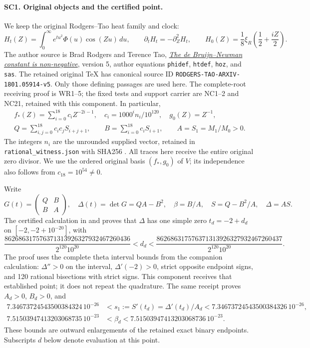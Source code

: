 \paragraph{SC1. Original objects and the certified point.}
We keep the original Rodgers--Tao heat family and clock:
\[
 H_t(Z)=\int_0^\infty e^{tu^2}\Phi(u)\cos(Zu)\,du,\qquad
 \partial_tH_t=-\partial_Z^2H_t,\qquad
 H_0(Z)=\frac18\xi_R\!\left(\frac12+\frac{iZ}{2}\right).
 \tag{SC1}
\]
The author source is Brad Rodgers and Terence Tao,
\href{https://arxiv.org/abs/1801.05914v5}{\emph{The de Bruijn--Newman
constant is non-negative}}, version 5, author equations
\texttt{phidef}, \texttt{htdef}, \texttt{hoz}, and \texttt{sas}.
The retained original TeX has canonical source ID
\texttt{RODGERS-TAO-ARXIV-1801.05914-v5}.
Only those defining passages are used here. The complete-root
receiving proof is WR1--5; the fixed tests and support carrier are
NC1--2 and NC21, retained with this component. In particular,
\[
 \begin{gathered}
 f_*(Z)=\sum_{i=0}^{18}c_iZ^{-2i-1},\quad
 c_i=1000^i n_i/10^{120},\quad g_0(Z)=Z^{-1},\\
 Q=\sum_{i,j=0}^{18}c_ic_jS_{i+j+1},\qquad
 B=\sum_{i=0}^{18}c_iS_{i+1},\qquad A=S_1=M_1/M_0>0 .
 \end{gathered}\tag{SC2}
\]
The integers \(n_i\) are the unrounded supplied vector, retained in
\texttt{rational\_witness.json} with SHA256
.
All traces here receive the entire original zero divisor. We use
the ordered original basis \((f_*,g_0)\) of \(V\); its independence
also follows from \(c_{18}=10^{54}\ne0\).

Write
\[
 G(t)=\begin{pmatrix}Q&B\\B&A\end{pmatrix},\quad
 \Delta(t)=\det G=QA-B^2,\quad
 \beta=B/A,\quad S=Q-B^2/A,\quad \Delta=AS.
 \tag{SC3}
\]
The certified calculation in
 and
 proves that \(\Delta\) has
one simple zero \(t_d=-2+d_d\) on \([-2,-2+10^{-20}]\), with
\[
 \frac{862686317576371313926327932467260436}{2^{120}10^{20}}
 <d_d<
 \frac{862686317576371313926327932467260437}{2^{120}10^{20}}.
 \tag{SC4}
\]
The proof uses the complete theta interval bounds from the
companion calculation: \(\Delta''>0\) on the interval,
\(\Delta'(-2)>0\), strict opposite endpoint signs, and 120
rational bisections with strict signs. This component receives
that established point; it does not repeat the quadrature.
The same receipt proves \(A_d>0\), \(B_d>0\), and
\[
 \begin{split}
 7.34673724543500384324\,10^{-26}
 &<s_1:=S'(t_d)=\Delta'(t_d)/A_d
 <7.34673724543500384326\,10^{-26},\\
 7.51503947413203068735\,10^{-23}
 &<\beta_d<7.51503947413203068736\,10^{-23}.
 \end{split}\tag{SC5}
\]
These bounds are outward enlargements of the retained exact binary
endpoints. Subscripts \(d\) below denote evaluation at this point.

